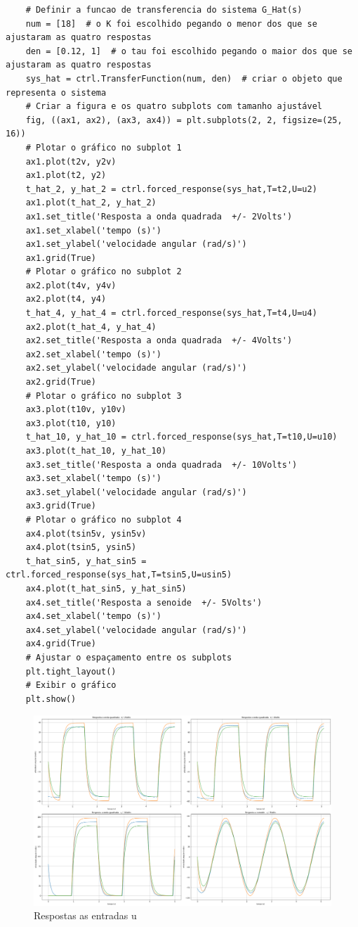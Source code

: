 \documentclass[10pt]{article}
\begin{document}
\begin{verbatim}
    # Definir a funcao de transferencia do sistema G_Hat(s)
    num = [18]  # o K foi escolhido pegando o menor dos que se ajustaram as quatro respostas
    den = [0.12, 1]  # o tau foi escolhido pegando o maior dos que se ajustaram as quatro respostas
    sys_hat = ctrl.TransferFunction(num, den)  # criar o objeto que representa o sistema
    # Criar a figura e os quatro subplots com tamanho ajustável
    fig, ((ax1, ax2), (ax3, ax4)) = plt.subplots(2, 2, figsize=(25, 16))
    # Plotar o gráfico no subplot 1
    ax1.plot(t2v, y2v)
    ax1.plot(t2, y2)
    t_hat_2, y_hat_2 = ctrl.forced_response(sys_hat,T=t2,U=u2)
    ax1.plot(t_hat_2, y_hat_2)
    ax1.set_title('Resposta a onda quadrada  +/- 2Volts')
    ax1.set_xlabel('tempo (s)')
    ax1.set_ylabel('velocidade angular (rad/s)')
    ax1.grid(True)
    # Plotar o gráfico no subplot 2
    ax2.plot(t4v, y4v)
    ax2.plot(t4, y4)
    t_hat_4, y_hat_4 = ctrl.forced_response(sys_hat,T=t4,U=u4)
    ax2.plot(t_hat_4, y_hat_4)
    ax2.set_title('Resposta a onda quadrada  +/- 4Volts')
    ax2.set_xlabel('tempo (s)')
    ax2.set_ylabel('velocidade angular (rad/s)')
    ax2.grid(True)
    # Plotar o gráfico no subplot 3
    ax3.plot(t10v, y10v)
    ax3.plot(t10, y10)
    t_hat_10, y_hat_10 = ctrl.forced_response(sys_hat,T=t10,U=u10)
    ax3.plot(t_hat_10, y_hat_10)
    ax3.set_title('Resposta a onda quadrada  +/- 10Volts')
    ax3.set_xlabel('tempo (s)')
    ax3.set_ylabel('velocidade angular (rad/s)')
    ax3.grid(True)
    # Plotar o gráfico no subplot 4
    ax4.plot(tsin5v, ysin5v)
    ax4.plot(tsin5, ysin5)
    t_hat_sin5, y_hat_sin5 = ctrl.forced_response(sys_hat,T=tsin5,U=usin5)
    ax4.plot(t_hat_sin5, y_hat_sin5)
    ax4.set_title('Resposta a senoide  +/- 5Volts')
    ax4.set_xlabel('tempo (s)')
    ax4.set_ylabel('velocidade angular (rad/s)')
    ax4.grid(True)
    # Ajustar o espaçamento entre os subplots
    plt.tight_layout()
    # Exibir o gráfico
    plt.show()
\end{verbatim}

\newpage

\begin{figure}[h]
    \centering
    \includegraphics[scale=0.3]{respostas.png}
    \caption{Respostas as entradas u}
\end{figure}
\end{document}
